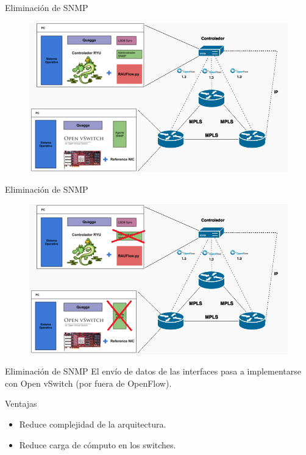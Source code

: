 \documentclass[xcolor=svgnames]{beamer}
\begin{document}
\begin{frame}{Eliminación de SNMP}
	\begin{figure}[t]
		\centering
		\includegraphics[scale=0.5]{componentes_rauflow}
	\end{figure}
\end{frame}

\begin{frame}{Eliminación de SNMP}
	\begin{figure}[t]
		\centering
		\includegraphics[scale=0.5]{componentes_rauflow_2}
	\end{figure}
\end{frame}

\begin{frame}{Eliminación de SNMP}
	El envío de datos de las interfaces pasa a implementarse con Open vSwitch (por fuera de OpenFlow).
	\begin{exampleblock}{Ventajas}
		\begin{itemize}
			\item Reduce complejidad de la arquitectura.
			\item Reduce carga de cómputo en los switches.
		\end{itemize}
	\end{exampleblock}
\end{frame}
\end{document}
